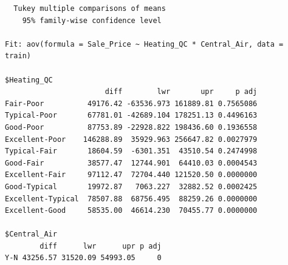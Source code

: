 \documentclass[
  letterpaper,
  DIV=11,
  numbers=noendperiod]{scrreprt}
\begin{document}
\begin{verbatim}
  Tukey multiple comparisons of means
    95% family-wise confidence level

Fit: aov(formula = Sale_Price ~ Heating_QC * Central_Air, data = train)

$Heating_QC
                       diff        lwr       upr     p adj
Fair-Poor          49176.42 -63536.973 161889.81 0.7565086
Typical-Poor       67781.01 -42689.104 178251.13 0.4496163
Good-Poor          87753.89 -22928.822 198436.60 0.1936558
Excellent-Poor    146288.89  35929.963 256647.82 0.0027979
Typical-Fair       18604.59  -6301.351  43510.54 0.2474998
Good-Fair          38577.47  12744.901  64410.03 0.0004543
Excellent-Fair     97112.47  72704.440 121520.50 0.0000000
Good-Typical       19972.87   7063.227  32882.52 0.0002425
Excellent-Typical  78507.88  68756.495  88259.26 0.0000000
Excellent-Good     58535.00  46614.230  70455.77 0.0000000

$Central_Air
        diff      lwr      upr p adj
Y-N 43256.57 31520.09 54993.05     0


\end{verbatim}
\end{document}
